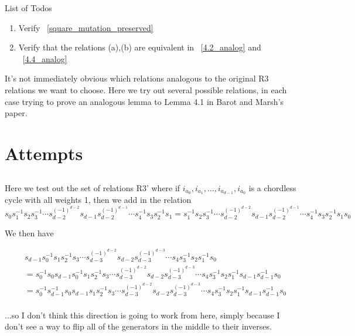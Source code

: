\documentclass[11pt]{amsart}
\makeatletter
\theoremstyle{definition}
\def\listtodoname{List of Todos}
\def\listoftodos{\@starttoc{tdo}\listtodoname}
\makeatother
\begin{document}
\listoftodos
\begin{enumerate}
	\item Verify ~\ref{square_mutation_preserved}
	\item Verify that the relations (a),(b) are equivalent in ~\ref{4.2_analog} and ~\ref{4.4_analog}
	\end{enumerate}
\newpage

It's not immediately obvious which relations analogous to the original R3 relations we want to choose.  Here we try out several possible relations, in each case trying to prove an analogous lemma to Lemma 4.1 in Barot and Marsh's paper.



\section{Attempts}

\subsection{}
Here we test out the set of relations R3' where if $i_{a_0}, i_{a_1},\ldots,i_{a_{d-1}},i_{a_0}$ is a chordless cycle with all weights 1, then we add in the relation 
$$s_0s_1^{-1}s_2s_3^{-1}\cdots s_{d-2}^{(-1)^{d-2}} s_{d-1}s_{d-2}^{(-1)^{d-1}}\cdots s_4^{-1}s_3s_2^{-1}s_1 = s_1^{-1}s_2s_3^{-1}\cdots s_{d-2}^{(-1)^{d-2}} s_{d-1}s_{d-2}^{(-1)^{d-1}}\cdots s_4^{-1}s_3s_2^{-1}s_1s_0$$


We then have

\begin{align*}
& s_{d-1}s_0^{-1}s_1s_2^{-1}s_3\cdots s_{d-3}^{(-1)^{d-2}} s_{d-2}s_{d-3}^{(-1)^{d-3}}\cdots s_4s_3^{-1}s_2s_1^{-1}s_0\\
&= s_0^{-1}s_0s_{d-1}s_0^{-1}s_1s_2^{-1}s_3\cdots s_{d-3}^{(-1)^{d-2}} s_{d-2}s_{d-3}^{(-1)^{d-3}}\cdots s_4s_3^{-1}s_2s_1^{-1}s_{d-1}s_{d-1}^{-1}s_0\\
&= s_0^{-1}s_{d-1}^{-1}s_0s_{d-1}s_1s_2^{-1}s_3\cdots s_{d-3}^{(-1)^{d-2}} s_{d-2}s_{d-3}^{(-1)^{d-3}}\cdots s_4s_3^{-1}s_2s_1^{-1}s_{d-1}s_{d-1}^{-1}s_0\\
\end{align*}


...so I don't think this direction is going to work from here, simply because I don't see a way to flip all of the generators in the middle to their inverses.
\end{document}
